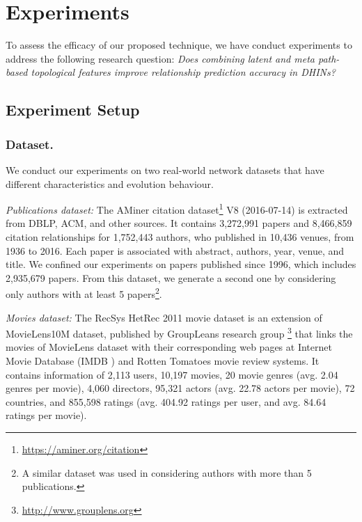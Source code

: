 \section{Experiments}

To assess the efficacy of our proposed technique, we have conduct experiments to address the following research question: \textit{Does combining latent and meta path-based topological features improve relationship prediction accuracy in DHINs?}


\subsection{Experiment Setup}

\subsubsection{Dataset.} We conduct our experiments on two real-world network datasets that have different characteristics and evolution behaviour. 

\textit{Publications dataset:} The AMiner citation dataset\footnote{\url{https://aminer.org/citation}} V8 (2016-07-14) is extracted from DBLP, ACM, and other sources. It contains 3,272,991 papers and 8,466,859 citation relationships for 1,752,443 authors, who published in 10,436 venues, from 1936 to 2016. Each paper is associated with abstract, authors, year, venue, and title. We confined our experiments on papers published since 1996, which includes 2,935,679 papers. From this dataset, we generate a second one by considering only authors with at least 5 papers\footnote{A similar dataset was used in \cite{sun2011ASONAM} considering authors with more than 5 publications.}.    
    
\textit{Movies dataset:} The RecSys HetRec 2011 movie dataset \cite{Cantador:RecSys2011} is an extension of MovieLens10M dataset, published by GroupLeans research group \footnote{\url{http://www.grouplens.org}} that links the movies of MovieLens dataset with their corresponding web pages at Internet Movie Database (IMDB%
) and Rotten Tomatoes %
movie review systems. It contains information of 2,113 users, 10,197 movies, 20 movie genres (avg. 2.04 genres per movie), 4,060 directors, 95,321 actors (avg. 22.78 actors per movie), 72 countries, and 855,598 ratings (avg. 404.92 ratings per user, and avg. 84.64 ratings per movie).%

